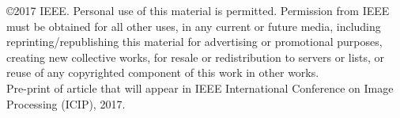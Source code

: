 \documentclass[journal,onecolumn,12pt]{IEEEtran}
\begin{document}
\noindent \copyright 2017 IEEE. Personal use of this material is permitted. Permission from IEEE must be obtained for all other uses, in any current or future media, including reprinting/republishing this material for advertising or promotional purposes, creating new collective works, for resale or redistribution to servers or lists, or reuse of any copyrighted component of this work in other works.
\\

\noindent Pre-print of article that will appear in IEEE International Conference on Image Processing (ICIP), 2017.
\\



\end{document}
